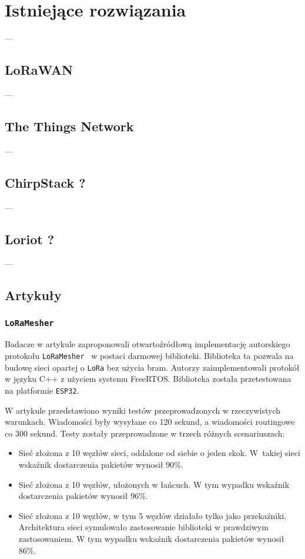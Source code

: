 
\chapter{Istniejące rozwiązania}
---
\section{LoRaWAN}
---
\section{The Things Network}
---
\section{ChirpStack ?}
---
\section{Loriot ?}
---
\section{Artykuły}
\subsection{\texttt{LoRaMesher}}
Badacze w artykule zaproponowali otwartoźródłową implementację autorskiego protokołu \texttt{LoRaMesher}~\cite{bib:loramesher} w postaci darmowej biblioteki. Biblioteka ta pozwala na budowę sieci opartej o \texttt{LoRa} bez użycia bram. Autorzy zaimplementowali protokół w języku C++ z użyciem systemu FreeRTOS. Biblioteka została przetestowana na platformie \texttt{ESP32}.

W artykule przedstawiono wyniki testów przeprowadzonych w rzeczywistych warunkach. Wiadomości były wysyłane co 120 sekund, a wiadomości routingowe co 300 sekund. Testy zostały przeprowadzone w trzech różnych scenariuszach:

\begin{itemize}
    \item Sieć złożona z 10 węzłów sieci, oddalone od siebie o jeden skok. W~takiej sieci wskaźnik dostarczenia pakietów wynosił 90\%.
    \item Sieć złożona z 10 węzłów, ułożonych w łańcuch. W tym wypadku wskaźnik dostarczenia pakietów wynosił 96\%.
    \item Sieć złożona z 10 węzłów, w tym 5 węzłów działało tylko jako przekaźniki. Architektura sieci symulowało zastosowanie biblioteki w prawdziwym zastosowaniem. W tym wypadku wskaźnik dostarczenia pakietów wynosił 86\%.
\end{itemize}

